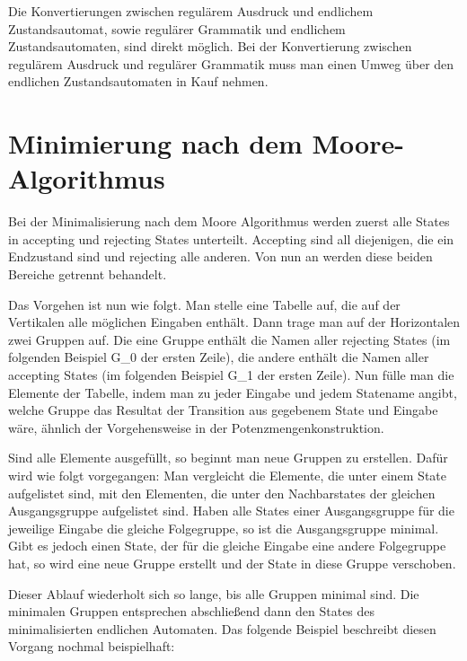 Die Konvertierungen zwischen regul\"arem Ausdruck und endlichem Zustandsautomat, sowie regul\"arer Grammatik und endlichem Zustandsautomaten, sind direkt m\"oglich. Bei der Konvertierung zwischen regul\"arem Ausdruck und regul\"arer Grammatik muss man einen Umweg \"uber den endlichen Zustandsautomaten in  Kauf nehmen.



\section{Minimierung nach dem Moore-Algorithmus}

Bei der Minimalisierung nach dem Moore Algorithmus werden zuerst alle States in accepting und rejecting States unterteilt. Accepting sind all diejenigen, die ein Endzustand sind und rejecting alle anderen. Von nun  an werden diese beiden Bereiche getrennt behandelt.

Das Vorgehen ist nun wie folgt. Man stelle eine Tabelle auf, die auf der Vertikalen alle m\"oglichen Eingaben enth\"alt. Dann trage man auf der Horizontalen zwei Gruppen auf. Die eine Gruppe enth\"alt die Namen aller rejecting States (im folgenden Beispiel G\_0 der ersten Zeile), die andere enthält die Namen aller accepting States (im folgenden Beispiel G\_1 der ersten Zeile). Nun f\"ulle man die Elemente der Tabelle, indem man zu jeder Eingabe und jedem Statename angibt, welche Gruppe das Resultat der Transition aus gegebenem State und Eingabe w\"are, \"ahnlich der Vorgehensweise in der Potenzmengenkonstruktion.
 
Sind alle Elemente ausgef\"ullt, so beginnt man neue Gruppen zu erstellen. Daf\"ur wird wie folgt vorgegangen: Man vergleicht die Elemente, die unter einem State aufgelistet sind, mit den Elementen, die unter den Nachbarstates der gleichen Ausgangsgruppe aufgelistet sind. Haben alle States einer Ausgangsgruppe f\"ur die jeweilige Eingabe die gleiche Folgegruppe, so ist die Ausgangsgruppe minimal. Gibt es jedoch einen State, der f\"ur die gleiche Eingabe eine andere Folgegruppe hat, so wird eine neue Gruppe erstellt und der State in diese Gruppe verschoben.

Dieser Ablauf wiederholt sich so lange, bis alle Gruppen minimal sind. Die minimalen Gruppen entsprechen abschließend dann den States des minimalisierten endlichen Automaten. Das folgende Beispiel beschreibt diesen Vorgang nochmal beispielhaft:

